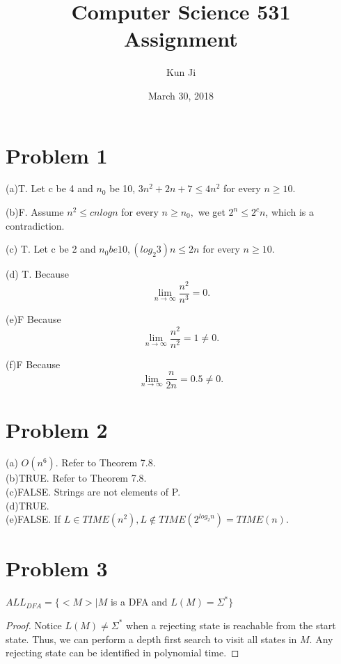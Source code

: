 \documentclass[paper=a4, fontsize=12pt]{scrartcl} %
\title{	
Computer Science 531 \\ Assignment \uppercase\expandafter{\romannumeral3} \\ %
}
\author{Kun Ji} %
\date{March 30, 2018} %
\numberwithin{equation}{section} %
\numberwithin{figure}{section} %
\numberwithin{table}{section} %
\begin{document}
\maketitle %

\section*{Problem 1}
(a)T. \quad Let c be 4 and $n_0$ be 10, $3n^2+2n+7 \leq 4n^2$ for every $n \geq 10.$ \par
(b)F.  \quad Assume $n^2 \leq cnlogn$ for every $n \geq n_0,$ we get $2^n \leq 2^cn$, which is a contradiction.
\par
(c) T. \quad  Let c be 2 and $n_0 be 10, (log_{2}3)n \leq 2n$ for every $n \geq 10.$ \par
(d) T. \quad  Because $$\lim_{n \to \infty}{\frac{n^2}{n^3}} = 0.$$  \par
(e)F   \quad Because $$\lim_{n \to \infty}{\frac{n^2}{n^2}} = 1 \neq 0.$$  \par
(f)F  \quad Because $$\lim_{n \to \infty}{\frac{n}{2n}} = 0.5 \neq 0. $$ \par  

\section*{Problem 2} 
(a) $O(n^6)$. Refer to Theorem 7.8.  \\
(b)TRUE. Refer to Theorem 7.8. \\
(c)FALSE. Strings are not elements of P.  \\
(d)TRUE. \\
(e)FALSE. If $L \in TIME(n^2), L\notin TIME(2^{log_2n}) = TIME(n)$.

\section*{Problem 3}
$ALL_{DFA} = \{<M>| M$ is a DFA and $L(M) = \Sigma^*\}$
\begin{proof}
Notice $L(M) \neq \Sigma^*$ when a rejecting state is reachable from the start state. Thus, we can perform a depth first search to visit all states in $M$. Any rejecting state can be identified in polynomial time.
\end{proof}
\par
\end{document}
